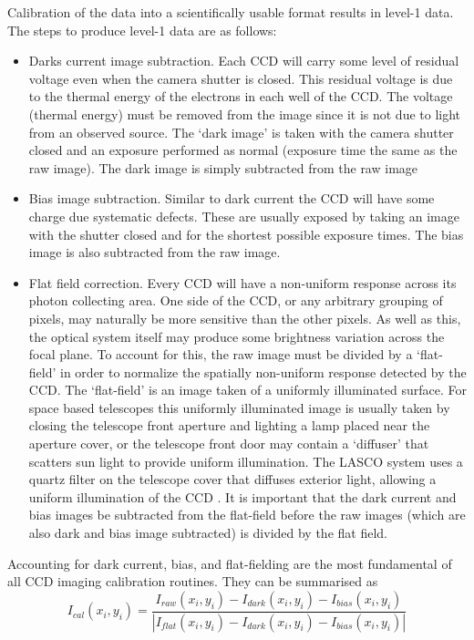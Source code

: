 Calibration of the data into a scientifically usable format results in level-1 data. The steps to produce level-1 data are as follows:
\begin{itemize}
\item Darks current image subtraction. Each CCD will carry some level of residual voltage even when the camera shutter is closed. This residual voltage is due to the thermal energy of the electrons in each well of the CCD. The voltage (thermal energy) must be removed from the image since it is not due to light from an observed source. The `dark image' is taken with the camera shutter closed and an exposure performed as normal (exposure time the same as the raw image). The dark image is simply subtracted from the raw image
%
\item Bias image subtraction. Similar to dark current the CCD will have some charge due systematic defects. These are usually exposed by taking an image with the shutter closed and for the shortest possible exposure times. The bias image is also subtracted from the raw image.
%
\item Flat field correction. Every CCD will have a non-uniform response across its photon collecting area. One side of the CCD, or any arbitrary grouping of pixels, may naturally be more sensitive than the other pixels. As well as this, the optical system itself may produce some brightness variation across the focal plane. To account for this, the raw image must be divided by a `flat-field' in order to normalize the spatially non-uniform response detected by the CCD. The `flat-field' is an image taken of a uniformly illuminated surface. For space based telescopes this uniformly illuminated image is usually taken by closing the telescope front aperture and lighting a lamp placed near the aperture cover, or the telescope front door may contain a `diffuser' that scatters sun light to provide uniform illumination. The LASCO system uses a quartz filter on the telescope cover that diffuses exterior light, allowing a uniform illumination of the CCD \citep{bru95}. It is important that the dark current and bias images be subtracted from the flat-field before the raw images (which are also dark and bias image subtracted) is divided by the flat field.
%
\end{itemize}
Accounting for dark current, bias, and flat-fielding are the most fundamental of all CCD imaging calibration routines. They can be summarised as
\begin{equation}
I_{cal}(x_i, y_i) = \frac{ I_{raw}(x_i, y_i)  - I_{dark}(x_i, y_i) - I_{bias}(x_i, y_i)  }{ | I_{flat}(x_i, y_i) - I_{dark}(x_i, y_i) - I_{bias}(x_i, y_i)| }
\end{equation}
